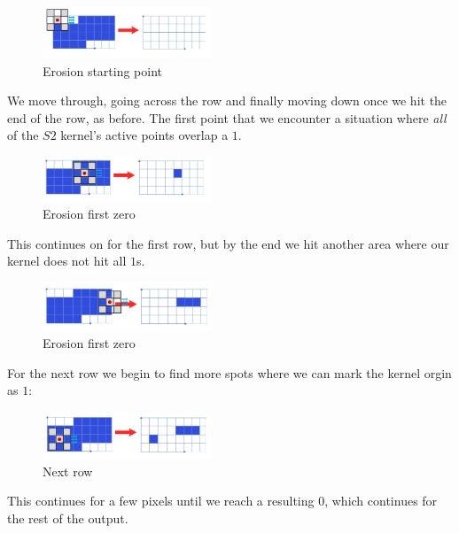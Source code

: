\documentclass{article}
\begin{document}
\begin{figure}[H]
    \centering
    \includegraphics[width = 0.45\textwidth]{imgs/5/a8.png}
    \caption{Erosion starting point}
    \label{fig:a8}
\end{figure}

We move through, going across the row and finally moving down once we hit the end of the row, as before. The first point that we encounter a situation where \textit{all} of the $S2$ kernel's active points overlap a $1$.

\begin{figure}[H]
    \centering
    \includegraphics[width = 0.45\textwidth]{imgs/5/a9.png}
    \caption{Erosion first zero}
    \label{fig:a9}
\end{figure}

This continues on for the first row, but by the end we hit another area where our kernel does not hit all $1$s.

\begin{figure}[H]
    \centering
    \includegraphics[width = 0.45\textwidth]{imgs/5/a10.png}
    \caption{Erosion first zero}
    \label{fig:a10}
\end{figure}

For the next row we begin to find more spots where we can mark the kernel orgin as $1$:

\begin{figure}[H]
    \centering
    \includegraphics[width = 0.45\textwidth]{imgs/5/a11.png}
    \caption{Next row}
    \label{fig:a11}
\end{figure}

This continues for a few pixels until we reach a resulting $0$, which continues for the rest of the output.
\end{document}
